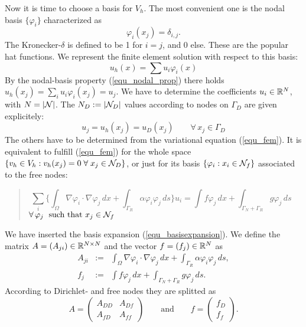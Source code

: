 Now it is time to choose a basis for $V_h$. The most convenient one is 
the nodal basis $\{ \varphi_i \}$ characterized as
%
\begin{equation}
\label{equ_nodal_prop}
\varphi_i(x_j) = \delta_{i,j}.
\end{equation}
%
The Kronecker-$\delta$ is defined to be 1 for $i=j$, and 0 else. These are the popular
hat functions.
We represent the finite element solution with respect to this basis:
\begin{equation}
\label{equ_basisexpansion}
u_h(x) = \sum u_i \varphi_i(x)
\end{equation}
By the nodal-basis property (\ref{equ_nodal_prop}) there holds 
$u_h(x_j) = \sum_i u_i \varphi_i(x_j) = u_j$.
We have to determine the coefficients $u_i \in {\mathbb R}^N$, with 
$N = | {\cal N} |$. The $N_D := | {\cal N}_D | $ values according to nodes on $\Gamma_D$ are
given explicitely:
$$
u_j = u_h (x_j) = u_D(x_j) \qquad \forall \, x_j \in \Gamma_D
$$
The others have to be determined from the variational equation (\ref{equ_fem}).
It is equivalent to fulfill (\ref{equ_fem}) for the whole space $\{ v_h \in V_h : v_h(x_j) = 0 \; \forall \; x_j \in {\cal N}_D \}$, or just for its basis 
$\{ \varphi_i : x_i \in {\cal N}_f\}$ associated to the free nodes:
\begin{quote}
\begin{equation}
\sum_i \Big\{ \int_\Omega \nabla \varphi_i \cdot \nabla \varphi_j \, dx +
 \int_{\Gamma_R} \alpha \varphi_i \varphi_j \, ds \Big\} u_i   = 
\int f \varphi_j \, dx + \int_{\Gamma_N+\Gamma_R} g \varphi_j \, ds \quad
\end{equation}
\hfill
$\forall \, \varphi_j \; \mbox{ such that } x_j \in {\cal N}_f$
\end{quote}
We have inserted the basis expansion (\ref{equ_basisexpansion}).
We define the matrix $A = (A_{ji}) \in {\mathbb R}^{N\times N}$ and the vector $f = (f_j) \in {\mathbb R}^N$ as
\begin{eqnarray*}
A_{ji} & := & \int_\Omega \nabla \varphi_i \cdot \nabla \varphi_j \, dx +
 \int_{\Gamma_R} \alpha \varphi_i \varphi_j \, ds, \\ 
f_j & := & \int f \varphi_j \, dx + \int_{\Gamma_N+\Gamma_R} g \varphi_j \, ds.
\end{eqnarray*}
According to Dirichlet- and free nodes they are splitted as
$$
A = \left( \begin{array}{cc}
        A_{DD} & A_{Df} \\
        A_{fD} & A_{ff} 
        \end{array} \right)
\qquad \text{and} \qquad
f = \left( \begin{array}{c}
        f_{D} \\
        f_{f}
        \end{array} \right).
$$
